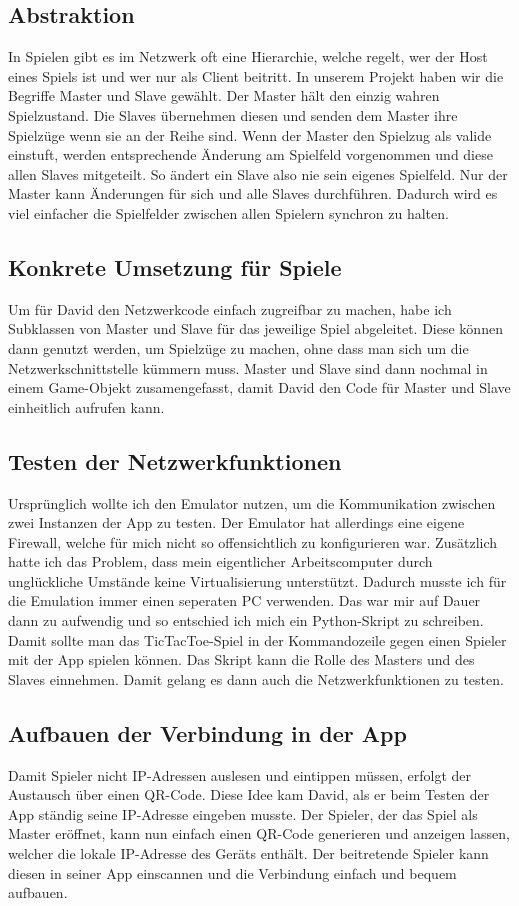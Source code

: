 \subsection{Abstraktion}
In Spielen gibt es im Netzwerk oft eine Hierarchie, welche regelt, wer der Host eines Spiels ist und wer nur als Client beitritt.
In unserem Projekt haben wir die Begriffe Master und Slave gewählt.
Der Master hält den einzig wahren Spielzustand. Die Slaves übernehmen diesen und senden dem Master ihre Spielzüge wenn
sie an der Reihe sind. Wenn der Master den Spielzug als valide einstuft, werden entsprechende Änderung
am Spielfeld vorgenommen und diese allen Slaves mitgeteilt.
So ändert ein Slave also nie sein eigenes Spielfeld. Nur der Master kann Änderungen für sich und alle Slaves durchführen.
Dadurch wird es viel einfacher die Spielfelder zwischen allen Spielern synchron zu halten.
\subsection{Konkrete Umsetzung für Spiele}
Um für David den Netzwerkcode einfach zugreifbar zu machen, habe ich Subklassen von Master und Slave für das jeweilige Spiel abgeleitet.
Diese können dann genutzt werden, um Spielzüge zu machen, ohne dass man sich um die Netzwerkschnittstelle kümmern muss.
Master und Slave sind dann nochmal in einem Game-Objekt zusamengefasst, damit David den Code für Master und Slave
einheitlich aufrufen kann.

\subsection{Testen der Netzwerkfunktionen}
Ursprünglich wollte ich den Emulator nutzen, um die Kommunikation zwischen zwei Instanzen der App zu testen.
Der Emulator hat allerdings eine eigene Firewall, welche für mich nicht so offensichtlich zu konfigurieren war.
Zusätzlich hatte ich das Problem, dass mein eigentlicher Arbeitscomputer durch unglückliche Umstände keine Virtualisierung unterstützt.
Dadurch musste ich für die Emulation immer einen seperaten PC verwenden. Das war mir auf Dauer dann zu aufwendig und so entschied ich mich
ein Python-Skript zu schreiben. Damit sollte man das TicTacToe-Spiel in der Kommandozeile gegen einen Spieler mit der App spielen können.
Das Skript kann die Rolle des Masters und des Slaves einnehmen. Damit gelang es dann auch die Netzwerkfunktionen zu testen.

\subsection{Aufbauen der Verbindung in der App}
Damit Spieler nicht IP-Adressen auslesen und eintippen müssen, erfolgt der Austausch über einen
QR-Code. Diese Idee kam David, als er beim Testen der App ständig seine IP-Adresse eingeben musste.
Der Spieler, der das Spiel als Master eröffnet, kann nun einfach einen QR-Code generieren
und anzeigen lassen, welcher die lokale IP-Adresse des Geräts enthält.
Der beitretende Spieler kann diesen in seiner App einscannen
und die Verbindung einfach und bequem aufbauen.
